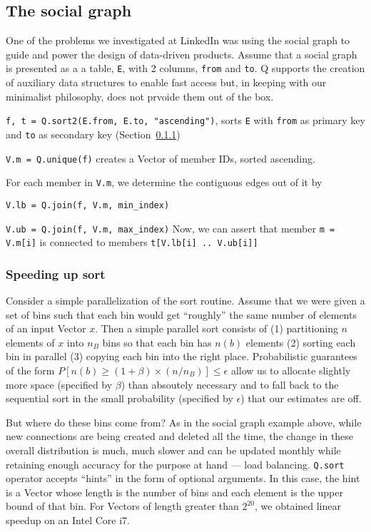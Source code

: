 \subsection{The social graph}
\label{social_graph}

One of the problems we investigated at LinkedIn was using the social graph to
guide and power the design of data-driven products.
Assume that a social graph is presented as a 
a table, {\tt E}, with 2 columns, {\tt from} and {\tt to}. Q supports the
creation of auxiliary data structures to enable fast access but, in keeping with
our minimalist philosophy, does not prvoide them out of the box.
\be
\item {\tt f, t = Q.sort2(E.from, E.to, "ascending")}, sorts {\tt E}
with {\tt from} as primary key and {\tt to} as
secondary key (Section~\ref{par_sort})
\item {\tt V.m = Q.unique(f)} creates a Vector of 
member IDs, sorted ascending. 
\item For each member in {\tt V.m}, we determine the contiguous edges out of it
  by 
  \be
\item {\tt V.lb = Q.join(f, V.m, min\_index)}
\item {\tt V.ub = Q.join(f, V.m, max\_index)}
  \ee
Now, we can assert that member
{\tt m = V.m[i]} is connected to members {\tt t[V.lb[i] .. V.ub[i]]}
\ee


\subsubsection{Speeding up sort}
\label{par_sort}
Consider a simple parallelization of the sort routine. Assume that we 
were given a set of bins such
that each bin would get ``roughly'' the same number of elements of an input
Vector \(x\). Then a simple parallel sort consists of 
(1) partitioning \(n\) elements of \(x\) into \(n_B\) bins so that each bin has
\(n(b)\) elements
(2) sorting each bin in parallel
(3) copying each bin into the right place. Probabilistic guarantees
of the form \(P[n(b) \geq (1+\beta) \times(n/n_B)] \leq \epsilon\) 
allow us to allocate slightly more space (specified by \(\beta\)) than absoutely necessary and to 
fall back to the sequential sort in the small probability (specified by
\(\epsilon\))  that our estimates are off.

But where do these bins come from? As in the social graph example above, while
new connections are being created and deleted all the time, the change in these
overall distribution is much, much slower and can be updated monthly while
retaining enough accuracy for the purpose at hand --- load balancing.
{\tt Q.sort} operator accepts ``hints'' in the form of
optional arguments. In this case, the hint is a Vector whose length is the
number of bins and each element is the upper bound of that bin. For Vectors of
length greater than \(2^{20}\), we obtained linear speedup on an Intel Core i7.

